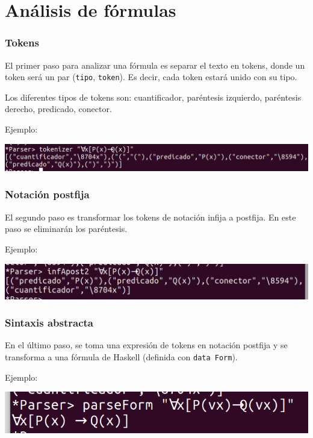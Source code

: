 \documentclass{beamer}
\begin{document}
\section{Análisis de fórmulas}

\begin{frame}
\frametitle{Tokens}

El primer paso para analizar una fórmula es separar el texto en tokens, donde un token será un par (\texttt{tipo}, \texttt{token}). Es decir, cada token estará unido con su tipo.

Los diferentes tipos de tokens son: cuantificador, paréntesis izquierdo, paréntesis derecho, predicado, conector.

Ejemplo:

\includegraphics[scale=0.2]{tokenizer.png}

\end{frame}

\begin{frame}
\frametitle{Notación postfija}

El segundo paso es transformar los tokens de notación infija a postfija. En este paso se eliminarán los paréntesis.

Ejemplo:

\includegraphics[scale=0.2]{postfija.png}

\end{frame}

\begin{frame}
\frametitle{Sintaxis abstracta}

En el último paso, se toma una expresión de tokens en notación postfija y se transforma a una fórmula de Haskell (definida con \texttt{data Form}).

Ejemplo:

\includegraphics[scale=0.3]{parseForm.png}

\end{frame}
\end{document}
